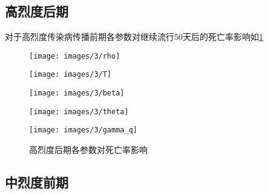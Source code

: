 \documentclass[withoutpreface,bwprint]{cumcmthesis}
\begin{document}
\subsection{高烈度后期}
对于高烈度传染病传播前期各参数对继续流行50天后的死亡率影响如\cref{fig:8}
\begin{figure}[H]
    \centering
    \begin{minipage}[c]{0.3\textwidth}
        \centering
        \texttt{[image: images/3/rho]}
        \subcaption{$\rho$}
    \end{minipage}
    \begin{minipage}[c]{0.3\textwidth}
        \centering
        \texttt{[image: images/3/T]}
    \end{minipage}
    \begin{minipage}[c]{0.3\textwidth}
        \centering
        \texttt{[image: images/3/beta]}
        \subcaption{$\beta$}
    \end{minipage}

    \begin{minipage}[c]{0.3\textwidth}
        \centering
        \texttt{[image: images/3/theta]}
        \subcaption{$\theta$}
    \end{minipage}
    \begin{minipage}[c]{0.3\textwidth}
        \centering
        \texttt{[image: images/3/gamma\_q]}
    \end{minipage}
    \caption{高烈度后期各参数对死亡率影响}
    \label{fig:8}

\end{figure}

\subsection{中烈度前期}
\end{document}

